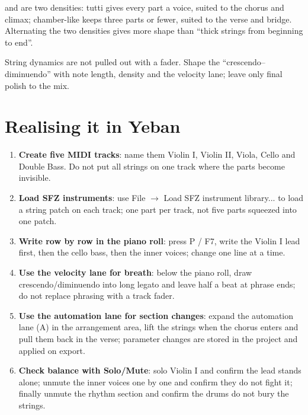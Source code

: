  and  are two densities: tutti gives every part a voice, suited to the chorus and climax; chamber-like keeps three parts or fewer, suited to the verse and bridge. Alternating the two densities gives more shape than ``thick strings from beginning to end''.

String dynamics are not pulled out with a fader. Shape the ``crescendo--diminuendo'' with note length, density and the velocity lane; leave only final polish to the mix.

\section{Realising it in Yeban}
\label{sec:string-yeban}

\begin{enumerate}
\item \textbf{Create five MIDI tracks}: name them Violin I, Violin II, Viola, Cello and Double Bass. Do not put all strings on one track where the parts become invisible.
\item \textbf{Load SFZ instruments}: use File $\rightarrow$ Load SFZ instrument library... to load a string patch on each track; one part per track, not five parts squeezed into one patch.
\item \textbf{Write row by row in the piano roll}: press P / F7, write the Violin I lead first, then the cello bass, then the inner voices; change one line at a time.
\item \textbf{Use the velocity lane for breath}: below the piano roll, draw crescendo/diminuendo into long legato and leave half a beat at phrase ends; do not replace phrasing with a track fader.
\item \textbf{Use the automation lane for section changes}: expand the automation lane (A) in the arrangement area, lift the strings when the chorus enters and pull them back in the verse; parameter changes are stored in the project and applied on export.
\item \textbf{Check balance with Solo/Mute}: solo Violin I and confirm the lead stands alone; unmute the inner voices one by one and confirm they do not fight it; finally unmute the rhythm section and confirm the drums do not bury the strings.
\end{enumerate}


